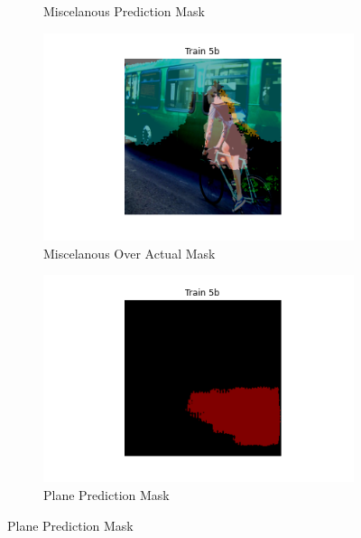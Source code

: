 \documentclass{article}
\begin{document}
\begin{figure}[h]
\begin{subfigure}[b]{0.45\textwidth}
    \caption{Miscelanous Prediction Mask}
  \end{subfigure}
  \hfill %
  \begin{subfigure}[b]{0.45\textwidth}
    \centering
    \includegraphics[width=\textwidth]{include/best model/msc1_over_actual.png} %
    \caption{Miscelanous Over Actual Mask}
  \end{subfigure}
  \begin{subfigure}[b]{0.45\textwidth}
    \centering
    \includegraphics[width=\textwidth]{include/best model/plane1_pred.png}
    \caption{Plane Prediction Mask}
  \end{subfigure}
  \hfill %

\end{figure}
\end{document}
